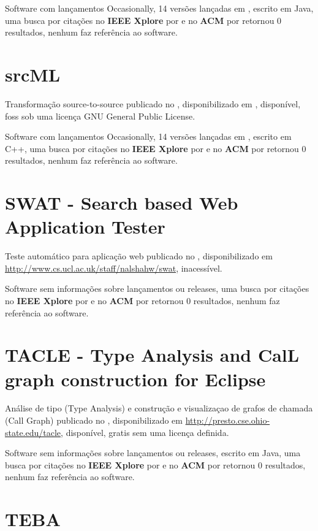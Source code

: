 Software com lançamentos Occasionally,
14 versões lançadas
em ,
escrito em Java,
uma busca por citações no {\bf IEEE Xplore} por
\texttt{}
e no {\bf ACM} por
\texttt{}
retornou
0 resultados,
nenhum faz referência ao software.



\section{srcML}

Transformação source-to-source
publicado no  ,
disponibilizado em \url{},
disponível,
foss
sob uma licença GNU General Public License.

Software com lançamentos Occasionally,
14 versões lançadas
em ,
escrito em C++,
uma busca por citações no {\bf IEEE Xplore} por
\texttt{}
e no {\bf ACM} por
\texttt{}
retornou
0 resultados,
nenhum faz referência ao software.



\section{SWAT - Search based Web Application Tester}

Teste automático para aplicação web
publicado no  ,
disponibilizado em \url{http://www.cs.ucl.ac.uk/staff/nalshahw/swat},
inacessível.

Software sem informações sobre lançamentos ou releases,
uma busca por citações no {\bf IEEE Xplore} por
\texttt{}
e no {\bf ACM} por
\texttt{}
retornou
0 resultados,
nenhum faz referência ao software.



\section{TACLE - Type Analysis and CalL graph construction for Eclipse}

Análise de tipo (Type Analysis) e construção e visualizaçao de grafos de chamada (Call Graph)
publicado no  ,
disponibilizado em \url{http://presto.cse.ohio-state.edu/tacle},
disponível,
gratis
sem uma licença definida.

Software sem informações sobre lançamentos ou releases,
escrito em Java,
uma busca por citações no {\bf IEEE Xplore} por
\texttt{}
e no {\bf ACM} por
\texttt{}
retornou
0 resultados,
nenhum faz referência ao software.



\section{TEBA}

